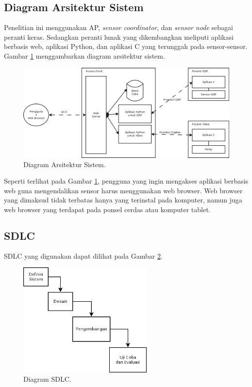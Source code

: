 		\subsection{Diagram Arsitektur Sistem}
			Penelitian ini menggunakan AP, \emph{sensor coordinator}, dan \emph{sensor node} sebagai peranti keras. Sedangkan peranti lunak yang dikembangkan meliputi aplikasi berbasis web, aplikasi Python, dan aplikasi C yang terunggah pada sensor-sensor. Gambar \ref{system-architecture} menggambarkan diagram arsitektur sistem.
			
			\begin{figure}[H]
			  \centering
			    \includegraphics[width=\textwidth]{gambar/system-architecture}
			    \caption{Diagram Arsitektur Sistem.}
			    \label{system-architecture}
			\end{figure}

			Seperti terlihat pada Gambar \ref{system-architecture}, pengguna yang ingin mengakses aplikasi berbasis web guna mengendalikan sensor harus menggunakan web browser. Web browser yang dimaksud tidak terbatas hanya yang terinstal pada komputer, namun juga web browser yang terdapat pada ponsel cerdas atau komputer tablet.

		\subsection{SDLC}
			SDLC yang digunakan dapat dilihat pada Gambar \ref{sdlc}.
			\begin{figure}[H]
			  \centering
			    \includegraphics[width=0.6\textwidth]{gambar/sdlc}
			    \caption{Diagram SDLC.}
			    \label{sdlc}
			\end{figure}
	
